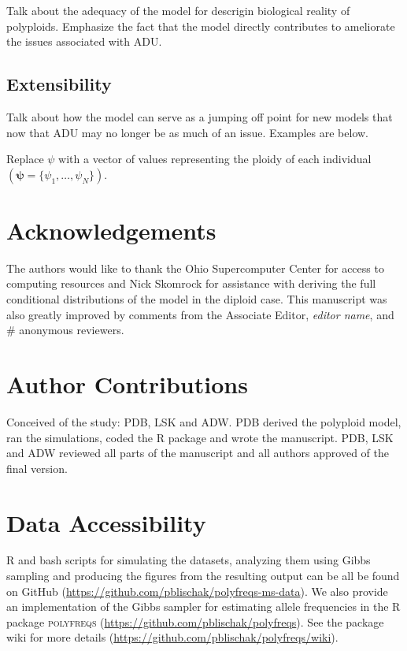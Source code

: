 \documentclass[11pt,english,letterpaper,oneside]{article}
\begin{document}
Talk about the adequacy of the model for descrigin biological reality of polyploids. Emphasize the fact that the model directly contributes to ameliorate the issues associated with ADU.

\medskip
\subsection*{Extensibility}
\medskip

Talk about how the model can serve as a jumping off point for new models that now that ADU may no longer be as much of an issue. Examples are below.
\medskip

Replace $\psi$ with a vector of values representing the ploidy of each individual $(\bm{\psi} = \{\psi_1,\ldots,\psi_N\})$.
\medskip



\section*{Acknowledgements}           %

The authors would like to thank the Ohio Supercomputer Center for access to computing resources and Nick Skomrock for assistance with deriving the full conditional distributions of the model in the diploid case. This manuscript was also greatly improved by comments from the Associate Editor, \textit{editor name}, and \# anonymous reviewers.
\medskip

\section*{Author Contributions}        %

Conceived of the study: PDB, LSK and ADW. PDB derived the polyploid model, ran the simulations, coded the R package and wrote the manuscript. PDB, LSK and ADW reviewed all parts of the manuscript and all authors approved of the final version.
\medskip

\section*{Data Accessibility}            %

R and bash scripts for simulating the datasets, analyzing them using Gibbs sampling and producing the figures from the resulting output can be all be found on GitHub (\url{https://github.com/pblischak/polyfreqs-ms-data}). We also provide an implementation of the Gibbs sampler for estimating allele frequencies in the R package \textsc{polyfreqs} (\url{https://github.com/pblischak/polyfreqs}). See the package wiki for more details (\url{https://github.com/pblischak/polyfreqs/wiki}).
\vspace{0.5in}
\end{document}
